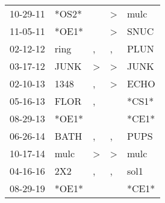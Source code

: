 \begin{supertabular}{lllll}
 10-29-11 &  *OS2* &               &  \textgreater &   mulc \\
 11-05-11 &  *OE1* &               &  \textgreater &   SNUC \\
 02-12-12 &   ring &             , &             , &   PLUN \\
 03-17-12 &   JUNK &  \textgreater &  \textgreater &   JUNK \\
 02-10-13 &   1348 &             , &  \textgreater &   ECHO \\
 05-16-13 &   FLOR &             , &               &  *CS1* \\
 08-29-13 &  *OE1* &               &               &  *CE1* \\
 06-26-14 &   BATH &             , &             , &   PUPS \\
 10-17-14 &   mulc &  \textgreater &  \textgreater &   mulc \\
 04-16-16 &    2X2 &             , &             , &   sol1 \\
 08-29-19 &  *OE1* &               &               &  *CE1* \\
\end{supertabular}
